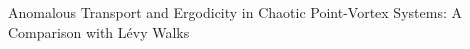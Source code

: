 \documentclass[]{article}
\begin{document}
Anomalous Transport and Ergodicity in Chaotic Point-Vortex Systems: A Comparison with Lévy Walks
\end{document}
